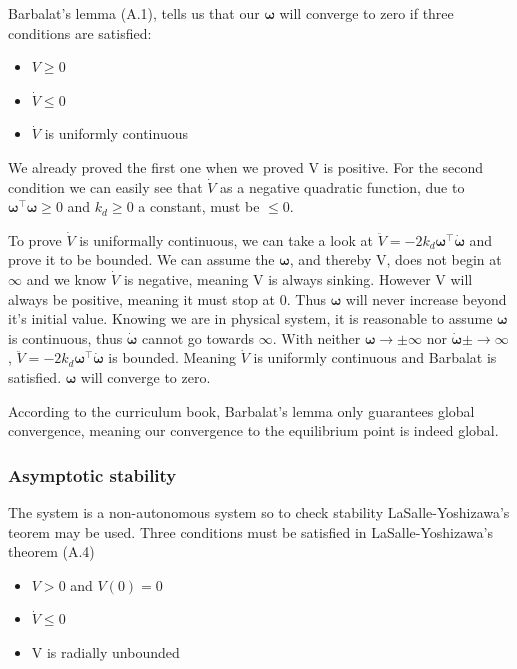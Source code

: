 Barbalat's lemma (A.1)\cite{Fossen2011}, tells us that our $\boldsymbol{\omega}$ will converge to zero if three conditions are satisfied: 

\begin{itemize}
    \item $V \geq 0$
    \item $\dot{V} \leq 0$
    \item $\dot{V}$ is uniformly continuous
\end{itemize}

We already proved the first one when we proved V is positive. For the second condition we can easily see that $\dot{V}$ as a negative quadratic function, due to $\boldsymbol{\omega}^\top\boldsymbol{\omega} \geq 0$ and $k_d \geq 0$ a constant, must be $\leq 0$.

To prove $\dot{V}$ is uniformally continuous, we can take a look at $\ddot{V} = -2k_d\boldsymbol{\omega}^\top\dot{\boldsymbol{\omega}}$ and prove it to be bounded. We can assume the $\boldsymbol{\omega}$, and thereby V, does not begin at $\infty$ and we know $\dot{V}$ is negative, meaning V is always sinking. However V will always be positive, meaning it must stop at 0. Thus $\boldsymbol{\omega}$ will never increase beyond it's initial value. Knowing we are in physical system, it is reasonable to assume $\boldsymbol{\omega}$ is continuous, thus $\dot{\boldsymbol{\omega}}$ cannot go towards $\infty$. With neither $\boldsymbol{\omega} \rightarrow \pm\infty$ nor $\dot{\boldsymbol{\omega}} \pm\rightarrow \infty$, $\ddot{V} = -2k_d\boldsymbol{\omega}^\top\dot{\boldsymbol{\omega}}$ is bounded. Meaning $\dot{V}$ is uniformly continuous and Barbalat is satisfied. $\boldsymbol{\omega}$ will converge to zero. 

According to the curriculum book\cite{Fossen2011}, Barbalat's lemma only guarantees global convergence, meaning our convergence to the equilibrium point is indeed global.

\subsubsection*{Asymptotic stability}

The system is a non-autonomous system so to check stability  LaSalle-Yoshizawa's teorem may be used. Three conditions must be satisfied in LaSalle-Yoshizawa's theorem (A.4)\cite{Fossen2011}

\begin{itemize}
    \item $V > 0$ and  $V(0) = 0$
    \item $\dot{V} \leq 0$
    \item V is radially unbounded
\end{itemize}

